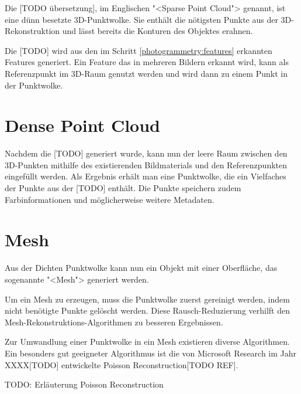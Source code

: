 Die [TODO übersetzung], im Englischen "<Sparse Point Cloud"> genannt, ist eine
dünn besetzte 3D-Punktwolke. Sie enthält die nötigsten Punkte aus der
3D-Rekonstruktion und lässt bereits die Konturen des Objektes erahnen.

Die [TODO] wird aus den im Schritt \ref{photogrammetry:features} erkannten
Features generiert. Ein Feature das in mehreren Bildern erkannt wird, kann als
Referenzpunkt im 3D-Raum genutzt werden und wird dann zu einem Punkt in der
Punktwolke.


\section{Dense Point Cloud}

Nachdem die [TODO] generiert wurde, kann nun der leere Raum zwischen den
3D-Punkten mithilfe des existierenden Bildmaterials und den Referenzpunkten
eingefüllt werden. Als Ergebnis erhält man eine Punktwolke, die ein Vielfaches
der Punkte aus der [TODO] enthält. Die Punkte speichern zudem Farbinformationen
und möglicherweise weitere Metadaten.


\section{Mesh}

Aus der Dichten Punktwolke kann nun ein Objekt mit einer Oberfläche, das
sogenannte "<Mesh"> generiert werden.


Um ein Mesh zu erzeugen, muss die Punktwolke zuerst gereinigt werden, indem
nicht benötigte Punkte gelöscht werden. Diese Rausch-Reduzierung verhilft den
Mesh-Rekonstruktions-Algorithmen zu besseren Ergebnissen.

Zur Umwandlung einer Punktwolke in ein Mesh existieren diverse Algorithmen. Ein
besonders gut geeigneter Algorithmus ist die von Microsoft Research im Jahr
XXXX[TODO] entwickelte Poisson Reconstruction[TODO REF].

TODO: Erläuterung Poisson Reconstruction


